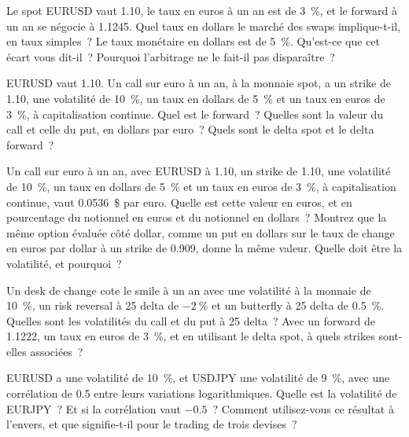 \begin{question}\label{iq:iv2:rates-and-fx:29}
Le spot EURUSD vaut 1.10, le taux en euros à un an est de 3~\%, et le forward à un an se négocie à 1.1245. Quel taux en dollars le marché des swaps implique-t-il, en taux simples~? Le taux monétaire en dollars est de 5~\%. Qu'est-ce que cet écart vous dit-il~? Pourquoi l'arbitrage ne le fait-il pas disparaître~?
\end{question}

\begin{question}\label{iq:iv2:rates-and-fx:30}
EURUSD vaut 1.10. Un call sur euro à un an, à la monnaie spot, a un strike de 1.10, une volatilité de 10~\%, un taux en dollars de 5~\% et un taux en euros de 3~\%, à capitalisation continue. Quel est le forward~? Quelles sont la valeur du call et celle du put, en dollars par euro~? Quels sont le delta spot et le delta forward~?
\end{question}

\begin{question}\label{iq:iv2:rates-and-fx:31}
Un call sur euro à un an, avec EURUSD à 1.10, un strike de 1.10, une volatilité de 10~\%, un taux en dollars de 5~\% et un taux en euros de 3~\%, à capitalisation continue, vaut 0.0536~\$ par euro. Quelle est cette valeur en euros, et en pourcentage du notionnel en euros et du notionnel en dollars~? Montrez que la même option évaluée côté dollar, comme un put en dollars sur le taux de change en euros par dollar à un strike de 0.909, donne la même valeur. Quelle doit être la volatilité, et pourquoi~?
\end{question}

\begin{question}\label{iq:iv2:rates-and-fx:32}
Un desk de change cote le smile à un an avec une volatilité à la monnaie de 10~\%, un risk reversal à 25 delta de $-2~\%$ et un butterfly à 25 delta de 0.5~\%. Quelles sont les volatilités du call et du put à 25 delta~? Avec un forward de 1.1222, un taux en euros de 3~\%, et en utilisant le delta spot, à quels strikes sont-elles associées~?
\end{question}

\begin{question}\label{iq:iv2:rates-and-fx:33}
EURUSD a une volatilité de 10~\%, et USDJPY une volatilité de 9~\%, avec une corrélation de 0.5 entre leurs variations logarithmiques. Quelle est la volatilité de EURJPY~? Et si la corrélation vaut $-0.5$~? Comment utilisez-vous ce résultat à l'envers, et que signifie-t-il pour le trading de trois devises~?
\end{question}

